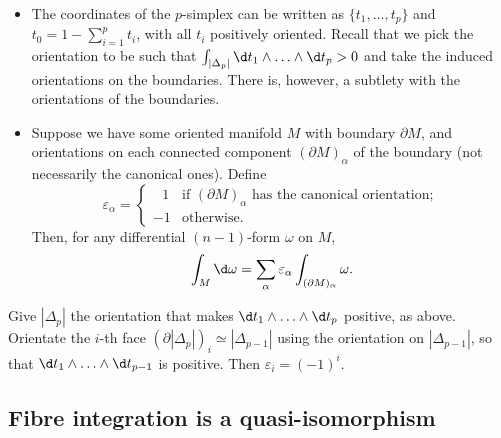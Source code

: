        \begin{itemize}
            \item The coordinates of the $p$-simplex can be written as $\{t_1,\ldots,t_p\}$ and $t_0=1-\sum_{i=1}^pt_i$, with all $t_i$ positively oriented.
            Recall that we pick the orientation to be such that $\int_{|\Delta_p|}\d t_1\wedge\ldots\wedge\d t_p>0$ and take the induced orientations on the boundaries.
            There is, however, a subtlety with the orientations of the boundaries.
            \item Suppose we have some oriented manifold $M$ with boundary $\partial M$, and orientations on each connected component $(\partial M)_\alpha$ of the boundary (not necessarily the canonical ones).
                Define
                \begin{equation*}
                    \varepsilon_\alpha =
                    \begin{cases}
                        \,\,\,\,1 &\text{if }(\partial M)_\alpha\text{ has the canonical orientation};\\
                        -1 &\text{otherwise.}
                    \end{cases}
                \end{equation*}
                Then, for any differential $(n-1)$-form $\omega$ on $M$,
                \begin{equation*}
                    \int_M\d\omega = \sum_{\alpha}\varepsilon_\alpha\int_{(\partial M)_\alpha}\omega.
                \end{equation*}
        \end{itemize}

        \begin{example}\label{example:orientation-of-simplices}
            Give $|\Delta_p|$ the orientation that makes $\d t_1\wedge\ldots\wedge\d t_p$ positive, as above.
            Orientate the $i$-th face $(\partial|\Delta_p|)_i\simeq |\Delta_{p-1}|$ using the orientation on $|\Delta_{p-1}|$, so that $\d t_1\wedge\ldots\wedge\d t_{p-1}$ is positive.
            Then $\varepsilon_i=(-1)^i$.
        \end{example}


    \subsection*{Fibre integration is a quasi-isomorphism} %
    \label{sub:fibre_integration_is_a_quasi_isomorphism}

